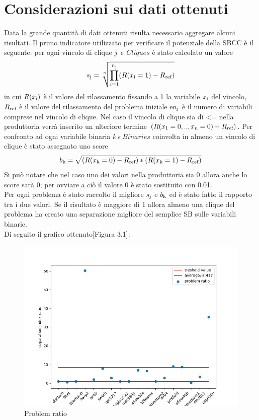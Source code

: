 \documentclass[12pt,a4paper,twoside,openright]{book}
\begin{document}
\section{Considerazioni sui dati ottenuti}
Data la grande quantità di dati ottenuti risulta necessario aggregare alcuni risultati. Il primo indicatore
utilizzato per verificare il potenziale della SBCC è il seguente: per ogni vincolo di clique 
$j\:\:\epsilon\:\:Cliques$ è stato calcolato un valore
\[ s\textsubscript{j} = \sqrt[n]{\prod_{i=1}^{n\textsubscript{j}} (R(x\textsubscript{i}=1)-R\textsubscript{ref}) }\] 
in cui $R(x\textsubscript{i})$ è il valore del rilassamento fissando a 1 la variabile $x\textsubscript{i}$
del vincolo, $R\textsubscript{ref}$ è il valore del rilassamento del problema iniziale e$n\textsubscript{j}$ è il 
numero di variabili comprese nel vincolo di clique. Nel caso il vincolo di clique sia di <= nella 
produttoria verrà inserito un ulteriore termine $(R(x\textsubscript{1}=0, .., x\textsubscript{n}=0)- R\textsubscript{ref})$.
Per confronto ad ogni variabile binaria $k\:\epsilon\:Binaries$ coinvolta in almeno un vincolo di clique è stato assegnato uno score
\[ b\textsubscript{k} = \sqrt{(R(x\textsubscript{k}=0)-R\textsubscript{ref})*(R(x\textsubscript{k}=1)-R\textsubscript{ref})}\] 
Si può notare che nel caso uno dei valori nella produttoria sia 0 allora anche lo score sarà 0; per ovviare a ciò il 
valore 0 è stato sostituito con 0.01.\\
Per ogni problema è stato raccolto il migliore $s\textsubscript{j}$ e $b\textsubscript{k}$ ed è stato fatto il rapporto
tra i due valori. Se il risultato è maggiore di 1 allora almeno una clique del problema ha creato una separazione migliore del semplice SB
sulle variabili binarie.\\
Di seguito il grafico ottenuto[Figura 3.1]:
\begin{figure}[ht]
    \centering
    \includegraphics [scale = 0.7]{chart_agg}
    \caption{Problem ratio}
    \label{fig:ratio}
\end{figure}
\end{document}

